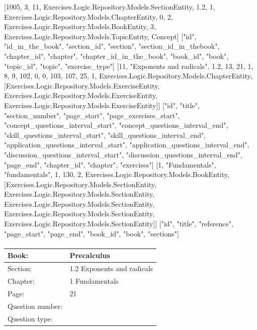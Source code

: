 \documentclass{article}
\begin{document}
    [1005, 3, 11, Exercises.Logic.Repository.Models.SectionEntity, 1.2, 1, Exercises.Logic.Repository.Models.ChapterEntity, 0, 2, Exercises.Logic.Repository.Models.BookEntity, 3, Exercises.Logic.Repository.Models.TopicEntity, Concept]
    ["id", "id_in_the_book", "section_id", "section", "section_id_in_thebook", "chapter_id", "chapter", "chapter_id_in_the_book", "book_id", "book", "topic_id", "topic", "exercise_type"]
    [11, "Exponents and radicals", 1.2, 13, 21, 1, 8, 9, 102, 0, 0, 103, 107, 25, 1, Exercises.Logic.Repository.Models.ChapterEntity, [Exercises.Logic.Repository.Models.ExerciseEntity, Exercises.Logic.Repository.Models.ExerciseEntity, Exercises.Logic.Repository.Models.ExerciseEntity]]
    ["id", "title", "section_number", "page_start", "page_exercises_start", "concept_questions_interval_start", "concept_questions_interval_end", "skill_questions_interval_start", "skill_questions_interval_end", "application_questions_interval_start", "application_questions_interval_end", "discussion_questions_interval_start", "discussion_questions_interval_end", "page_end", "chapter_id", "chapter", "exercises"]
    [1, "Fundamentals", "fundamentals", 1, 130, 2, Exercises.Logic.Repository.Models.BookEntity, [Exercises.Logic.Repository.Models.SectionEntity, Exercises.Logic.Repository.Models.SectionEntity, Exercises.Logic.Repository.Models.SectionEntity, Exercises.Logic.Repository.Models.SectionEntity, Exercises.Logic.Repository.Models.SectionEntity]]
    ["id", "title", "reference", "page_start", "page_end", "book_id", "book", "sections"]

   \paragraph{}
   \begin{tabularx}{1\textwidth}{
           p{}
           p{}
       }
       \toprule
       Book: & Precalculus
       \\
       \midrule
       Section: & 1.2 Exponents and radicals
       \\
       \midrule
       Chapter: & 1 Fundamentals
       \\
       \midrule
       Page: & 21
       \\
       \midrule
       Question number: & 
       \\
       \midrule
       Question type: & 
       \\
       \bottomrule
   \end{tabularx}
\end{document}
